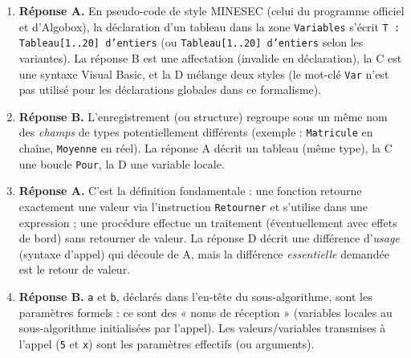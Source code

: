 \documentclass[11pt]{article}
\newcommand{\cle}[1]{{\popxbold\color{popdark}#1}}
\begin{document}
\begin{corrige}
\begin{enumerate}
    \item \textbf{Réponse A.} En pseudo-code de style MINESEC (celui du programme officiel et d'Algobox), la déclaration d'un tableau dans la zone \texttt{Variables} s'écrit \texttt{T : Tableau[1..20] d'entiers} (ou \texttt{Tableau[1..20] d'entiers} selon les variantes). La réponse B est une affectation (invalide en déclaration), la C est une syntaxe Visual Basic, et la D mélange deux styles (le mot-clé \texttt{Var} n'est pas utilisé pour les déclarations globales dans ce formalisme).
    \item \textbf{Réponse B.} L'\cle{enregistrement} (ou structure) regroupe sous un même nom des \emph{champs} de types potentiellement différents (exemple : \texttt{Matricule} en chaîne, \texttt{Moyenne} en réel). La réponse A décrit un tableau (même type), la C une boucle \texttt{Pour}, la D une variable locale.
    \item \textbf{Réponse A.} C'est la définition fondamentale : une \cle{fonction} retourne exactement une valeur via l'instruction \texttt{Retourner} et s'utilise dans une expression ; une \cle{procédure} effectue un traitement (éventuellement avec effets de bord) sans retourner de valeur. La réponse D décrit une différence d'\emph{usage} (syntaxe d'appel) qui découle de A, mais la différence \emph{essentielle} demandée est le retour de valeur.
    \item \textbf{Réponse B.} \texttt{a} et \texttt{b}, déclarés dans l'en-tête du sous-algorithme, sont les \cle{paramètres formels} : ce sont des « noms de réception » (variables locales au sous-algorithme initialisées par l'appel). Les valeurs/variables transmises à l'appel (\texttt{5} et \texttt{x}) sont les \cle{paramètres effectifs} (ou arguments).
\end{enumerate}
\end{corrige}
\end{document}
